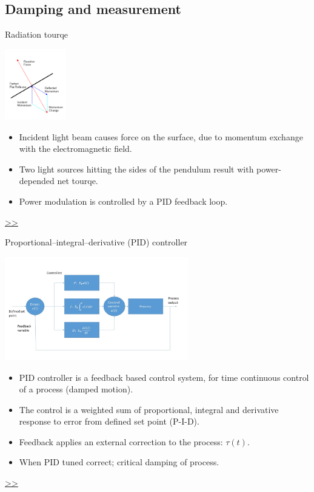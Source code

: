 \documentclass{beamer}
\begin{document}
\subsection{Damping and measurement}
\begin{frame}{\hypertarget{frame:Radiation tourqe}{Radiation tourqe}}
	\begin{center}		
		\includegraphics[width=0.2\textwidth,keepaspectratio]{radiation.PNG}
    \end{center}

	
	\begin{itemize}		
		
		\item Incident light beam causes force on the surface, due to momentum exchange with the electromagnetic field.
		\item Two light sources hitting the sides of the pendulum result with power-depended net tourqe.
		\item Power modulation is controlled by a PID feedback loop.
		
	\end{itemize}
	\hyperlink{frame:Radiation tourqe 1}{>>} 
\end{frame}
\begin{frame}{\hypertarget{frame:Proportional–integral–derivative (PID) controller}{Proportional–integral–derivative (PID) controller}}
	\begin{center}		
		\includegraphics[width=0.6\textwidth,keepaspectratio]{pid_diagram_powerpoint.jpg}
    \end{center}
	\begin{itemize}	
		\item PID controller is a feedback based control system, for time continuous control of a process (damped motion).
		\item The control is a weighted sum of proportional, integral and derivative response to error from defined set point (P-I-D).
		\item Feedback applies an external correction to the process: $\tau(t)$.
		\item When PID tuned correct; critical damping of process.

	\end{itemize}
	\hyperlink{frame:Proportional–integral–derivative (PID) controller 1}{>>} 
\end{frame}
\end{document}
